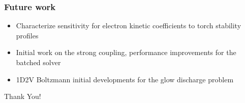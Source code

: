 \documentclass[mathserif, aspectratio=169]{beamer}
\begin{document}

%	

\begin{frame}
	\frametitle{Future work}
	\begin{itemize}
		\item Characterize sensitivity for electron kinetic coefficients to torch stability profiles
		\item Initial work on the strong coupling, performance improvements for the batched solver
		\item 1D2V Boltzmann initial developments for the glow discharge problem
	\end{itemize}
	\begin{center}
		Thank You!
	\end{center}
\end{frame}
\end{document}
